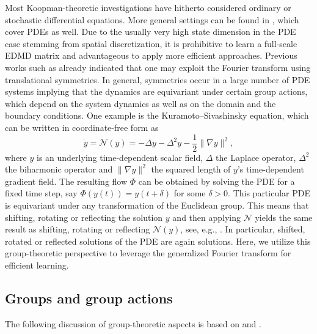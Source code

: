 \documentclass[preprint,12pt,authoryear]{elsarticle}
\newcommand{\Ncal}{\mathcal{N}}
\begin{document}
{Most Koopman-theoretic investigations have hitherto considered ordinary or stochastic differential equations. More general settings can be found in \cite{baddooPhysicsinformedDynamicMode2023, hochrainerApproximationTranslationInvariant2024b, PSB+24,nathan2018applied}, which cover PDEs as well.
Due to the usually very high state dimension in the PDE case stemming from spatial discretization, it is prohibitive to learn a full-scale EDMD matrix and advantageous to apply more efficient approaches. %
Previous works such as \cite{baddooPhysicsinformedDynamicMode2023,hochrainerApproximationTranslationInvariant2024b} already indicated that one may exploit the Fourier transform using translational symmetries.
In general, symmetries occur in a large number of PDE systems implying that the dynamics are equivariant under certain group actions, which depend on the system dynamics as well as on the domain and the boundary conditions.
One example is %
the Kuramoto--Sivashinsky equation, which can be written in coordinate-free form as
\begin{equation}
    \dot y = \Ncal(y) = -\Delta y - \Delta^2 y - \textstyle\frac 1 2 \lVert \nabla y \rVert^2, \label{eq:ks}
\end{equation}
where $y$ is an underlying time-dependent scalar field, $\Delta$ the Laplace operator, $\Delta^2$ the biharmonic operator and $\lVert \nabla y \rVert^2$ the squared length of $y$'s time-dependent gradient field. The resulting flow $\Phi$ can be obtained by solving the PDE for a fixed time step, say $\Phi(y(t)) = y(t+\delta)$ for some $\delta >0$.
This particular PDE is equivariant under any transformation of the Euclidean group. %
This means that shifting, rotating or reflecting the solution $y$ and then applying $\Ncal$ yields the same result as shifting, rotating or reflecting $\Ncal(y)$, see, e.g., \cite{HRV+24}. In particular, shifted, rotated or reflected solutions of the PDE are again solutions. %
Here, we utilize this group-theoretic perspective %
to leverage the generalized Fourier transform for efficient learning.  %


\subsection{Groups and group actions} \label{sec:groups}

The following discussion of group-theoretic aspects is based on \cite{ahlanderApplicationsGeneralizedFourier2005,ahlander_eigenvalues_2006} and \cite{terras1999fourier}.

}
\end{document}
